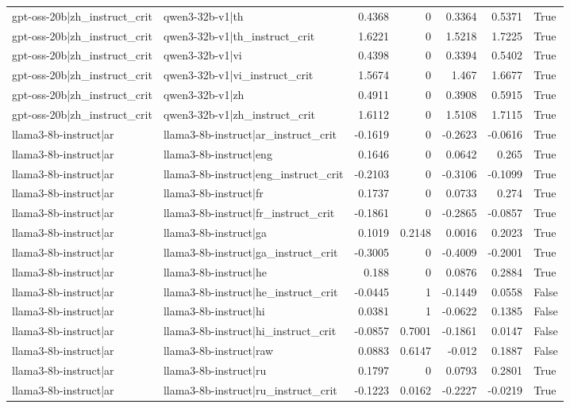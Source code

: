 \begin{table}
\begin{tabular}{l l r r r r l}
gpt-oss-20b|zh_instruct_crit & qwen3-32b-v1|th & 0.4368 & 0 & 0.3364 & 0.5371 & True \\
gpt-oss-20b|zh_instruct_crit & qwen3-32b-v1|th_instruct_crit & 1.6221 & 0 & 1.5218 & 1.7225 & True \\
gpt-oss-20b|zh_instruct_crit & qwen3-32b-v1|vi & 0.4398 & 0 & 0.3394 & 0.5402 & True \\
gpt-oss-20b|zh_instruct_crit & qwen3-32b-v1|vi_instruct_crit & 1.5674 & 0 & 1.467 & 1.6677 & True \\
gpt-oss-20b|zh_instruct_crit & qwen3-32b-v1|zh & 0.4911 & 0 & 0.3908 & 0.5915 & True \\
gpt-oss-20b|zh_instruct_crit & qwen3-32b-v1|zh_instruct_crit & 1.6112 & 0 & 1.5108 & 1.7115 & True \\
llama3-8b-instruct|ar & llama3-8b-instruct|ar_instruct_crit & -0.1619 & 0 & -0.2623 & -0.0616 & True \\
llama3-8b-instruct|ar & llama3-8b-instruct|eng & 0.1646 & 0 & 0.0642 & 0.265 & True \\
llama3-8b-instruct|ar & llama3-8b-instruct|eng_instruct_crit & -0.2103 & 0 & -0.3106 & -0.1099 & True \\
llama3-8b-instruct|ar & llama3-8b-instruct|fr & 0.1737 & 0 & 0.0733 & 0.274 & True \\
llama3-8b-instruct|ar & llama3-8b-instruct|fr_instruct_crit & -0.1861 & 0 & -0.2865 & -0.0857 & True \\
llama3-8b-instruct|ar & llama3-8b-instruct|ga & 0.1019 & 0.2148 & 0.0016 & 0.2023 & True \\
llama3-8b-instruct|ar & llama3-8b-instruct|ga_instruct_crit & -0.3005 & 0 & -0.4009 & -0.2001 & True \\
llama3-8b-instruct|ar & llama3-8b-instruct|he & 0.188 & 0 & 0.0876 & 0.2884 & True \\
llama3-8b-instruct|ar & llama3-8b-instruct|he_instruct_crit & -0.0445 & 1 & -0.1449 & 0.0558 & False \\
llama3-8b-instruct|ar & llama3-8b-instruct|hi & 0.0381 & 1 & -0.0622 & 0.1385 & False \\
llama3-8b-instruct|ar & llama3-8b-instruct|hi_instruct_crit & -0.0857 & 0.7001 & -0.1861 & 0.0147 & False \\
llama3-8b-instruct|ar & llama3-8b-instruct|raw & 0.0883 & 0.6147 & -0.012 & 0.1887 & False \\
llama3-8b-instruct|ar & llama3-8b-instruct|ru & 0.1797 & 0 & 0.0793 & 0.2801 & True \\
llama3-8b-instruct|ar & llama3-8b-instruct|ru_instruct_crit & -0.1223 & 0.0162 & -0.2227 & -0.0219 & True \\

\end{tabular}
\end{table}
